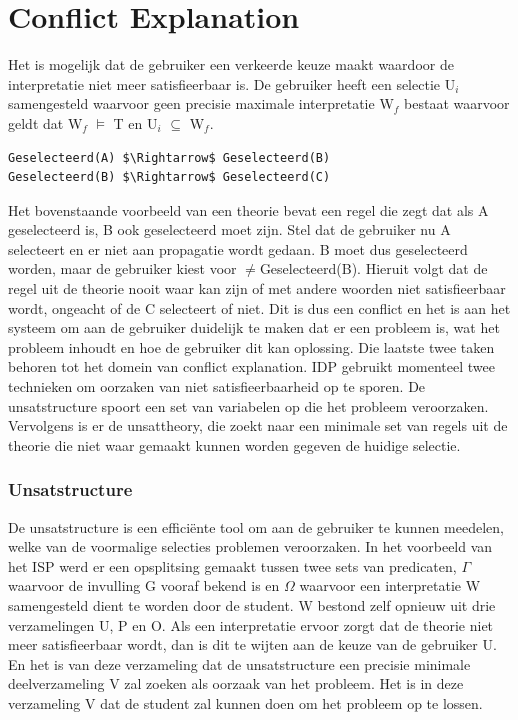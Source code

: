 \section{Conflict Explanation}
Het is mogelijk dat de gebruiker een verkeerde keuze maakt waardoor de interpretatie niet meer satisfieerbaar is. De gebruiker heeft een selectie U$_{i}$ samengesteld waarvoor geen precisie maximale interpretatie W$_{f}$ bestaat waarvoor geldt dat W$_{f}$ $\models$ T en U$_{i}$ $\subseteq$ W$_{f}$.
\lstset{basicstyle=\scriptsize}
\begin{lstlisting}[mathescape]
Geselecteerd(A) $\Rightarrow$ Geselecteerd(B)
Geselecteerd(B) $\Rightarrow$ Geselecteerd(C)
\end{lstlisting}
Het bovenstaande voorbeeld van een theorie bevat een regel die zegt dat als A geselecteerd is, B ook geselecteerd moet zijn. Stel dat de gebruiker nu A selecteert en er niet aan propagatie wordt gedaan. B moet dus geselecteerd worden, maar de gebruiker kiest voor $\neq$Geselecteerd(B). Hieruit volgt dat de regel uit de theorie nooit waar kan zijn of met andere woorden niet satisfieerbaar wordt, ongeacht of de C selecteert of niet. Dit is dus een conflict en het is aan het systeem om aan de gebruiker duidelijk te maken dat er een probleem is, wat het probleem inhoudt en hoe de gebruiker dit kan oplossing. Die laatste twee taken behoren tot het domein van conflict explanation. IDP gebruikt momenteel twee technieken om oorzaken van niet satisfieerbaarheid op te sporen. De unsatstructure spoort een set van variabelen op die het probleem veroorzaken. Vervolgens is er de unsattheory, die zoekt naar een minimale set van regels uit de theorie die niet waar gemaakt kunnen worden gegeven de huidige selectie.

\subsubsection{Unsatstructure}
De unsatstructure is een effici\"{e}nte tool om aan de gebruiker te kunnen meedelen, welke van de voormalige selecties problemen veroorzaken. In het voorbeeld van het ISP werd er een opsplitsing gemaakt tussen twee sets van predicaten, $\Gamma$ waarvoor de invulling G vooraf bekend is en $\Omega$ waarvoor een interpretatie W samengesteld dient te worden door de student. W bestond zelf opnieuw uit drie verzamelingen U, P en O. Als een interpretatie ervoor zorgt dat de theorie niet meer satisfieerbaar wordt, dan is dit te wijten aan de keuze van de gebruiker U. En het is van deze verzameling dat de unsatstructure een precisie minimale deelverzameling V zal zoeken als oorzaak van het probleem. Het is in deze verzameling V dat de student zal kunnen doen om het probleem op te lossen. 

